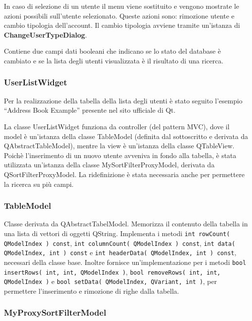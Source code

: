 \documentclass[a4paper]{article}
\begin{document}
In caso di selezione di un utente il menu viene sostituito e vengono mostrate le azioni possibili sull'utente selezionato. Queste azioni sono: rimozione utente e cambio tipologia dell'account. Il cambio tipologia avviene tramite un'istanza di \textbf{ChangeUserTypeDialog}.

Contiene due campi dati booleani che indicano se lo stato del database è cambiato e se la lista degli utenti visualizzata è il risultato di una ricerca.

\subsubsection*{UserListWidget}
Per la realizzazione della tabella della lista degli utenti è stato seguito l'esempio ``Address Book Example'' presente nel sito ufficiale di Qt.

La classe UserListWidget funziona da controller (del pattern MVC), dove il model è un'istanza della classe TableModel (definita dal sottoscritto e derivata da QAbstractTableModel), mentre la view è un'istanza della classe QTableView. Poichè l'inserimento di un nuovo utente avveniva in fondo alla tabella, è stata utilizzata un'istanza della classe MySortFilterProxyModel, derivata da QSortFilterProxyModel. La ridefinizione è stata necessaria anche per permettere la ricerca su più campi.

\subsubsection*{TableModel}
Classe derivata da QAbstractTabelModel. Memorizza il contenuto della tabella in una lista di vettori di oggetti QString. Implementa i metodi \texttt{int rowCount( QModelIndex ) const}, \texttt{int columnCount( QModelIndex ) const}, \texttt{int data( QModelIndex, int ) const} e \texttt{int headerData( QModelIndex, int ) const}, necessari della classe base. Inoltre fornisce un'implementazione per i metodi \texttt{bool insertRows( int, int, QModelIndex )}, \texttt{bool removeRows( int, int, QModelIndex )} e \texttt{bool setData( QModelIndex, QVariant, int )}, per permettere l'inserimento e rimozione di righe dalla tabella.

\subsubsection*{MyProxySortFilterModel}
\end{document}
